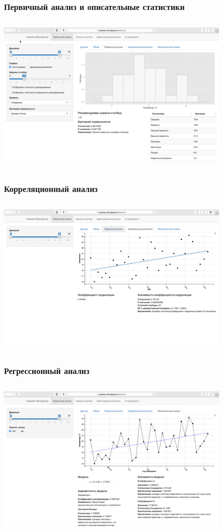 \documentclass[10pt, ucs, pdf,aspectratio=169]{beamer}
\begin{document}
\begin{frame}
  \frametitle{Первичный анализ и описательные статистики}   %
   \begin{columns}[c]
   \column{4.5in}
  \includegraphics[width=4.5in]{../../figures/static/1_basis.png}
  \end{columns}
\end{frame}

\begin{frame}
  \frametitle{Корреляционный анализ}   %
   \begin{columns}[c]
   \column{4.5in}
  \includegraphics[width=4.5in]{../../figures/static/p_corr.png}
  \end{columns}
\end{frame}

\begin{frame}
  \frametitle{Регрессионный анализ}   %
   \begin{columns}[c]
   \column{4.5in}
  \includegraphics[width=4.5in]{../../figures/static/2_regr.png}
  \end{columns}
\end{frame}
\end{document}
